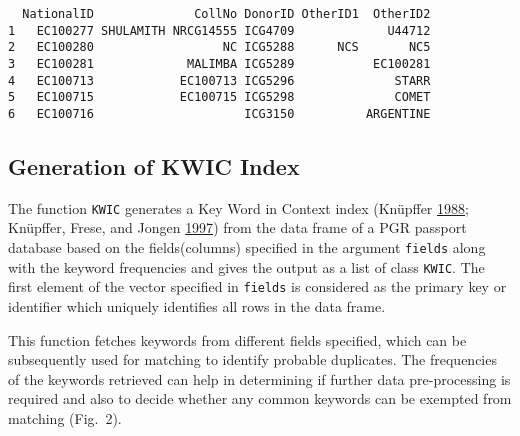 \documentclass[
]{article}
\begin{document}
\begin{verbatim}
  NationalID              CollNo DonorID OtherID1  OtherID2
1   EC100277 SHULAMITH NRCG14555 ICG4709             U44712
2   EC100280                  NC ICG5288      NCS       NC5
3   EC100281             MALIMBA ICG5289           EC100281
4   EC100713            EC100713 ICG5296              STARR
5   EC100715            EC100715 ICG5298              COMET
6   EC100716                     ICG3150          ARGENTINE
\end{verbatim}

\hypertarget{generation-of-kwic-index}{%
\subsection{Generation of KWIC Index}\label{generation-of-kwic-index}}

The function \texttt{KWIC} generates a Key Word in Context index
(Knüpffer \protect\hyperlink{ref-knupffer1988european}{1988}; Knüpffer,
Frese, and Jongen \protect\hyperlink{ref-kfj97}{1997}) from the data
frame of a PGR passport database based on the fields(columns) specified
in the argument \texttt{fields} along with the keyword frequencies and
gives the output as a list of class \texttt{KWIC}. The first element of
the vector specified in \texttt{fields} is considered as the primary key
or identifier which uniquely identifies all rows in the data frame.

This function fetches keywords from different fields specified, which
can be subsequently used for matching to identify probable duplicates.
The frequencies of the keywords retrieved can help in determining if
further data pre-processing is required and also to decide whether any
common keywords can be exempted from matching (Fig.~2).
\end{document}
